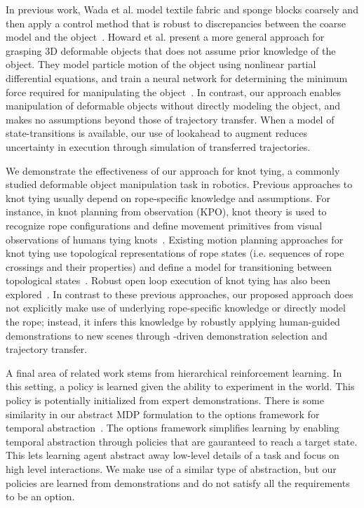 In previous work, Wada et al. model textile fabric and sponge blocks
coarsely and then apply a control method that is robust
to discrepancies between the coarse model and the
object~\cite{Wada_ArticMotion2000}. Howard et al. present a more
general approach for grasping 3D deformable objects
that does not assume prior knowledge of the object.
They model particle motion of the object using nonlinear partial differential
equations, and train a neural network for determining the minimum force
required for manipulating the object~\cite{Howard_AutRobots2000}.
In contrast, our approach enables manipulation of deformable objects
without directly modeling the object, and makes no assumptions beyond
those of trajectory transfer. When a model of state-transitions
is available, our use of
lookahead to augment \mmql{} reduces uncertainty in execution through
simulation of transferred trajectories.

We demonstrate the effectiveness of our approach for
knot tying, a commonly studied deformable object manipulation task in robotics.
Previous approaches to knot tying usually depend on rope-specific knowledge
and assumptions.
For instance, in knot planning from observation (KPO), knot theory is used
to recognize rope configurations and define
movement primitives from visual observations of humans tying
knots~\cite{Morita_ICRA2003, Takamatsu_TransRob2006}.
Existing motion planning approaches for knot tying use topological
representations of rope states (i.e. sequences of rope crossings and their
properties) and define a model for transitioning between topological
states~\cite{Moll_IEEERobot2006, Saha_ExpRobotics2008, Wakamatsu_IJRR2006}.
Robust open loop execution of knot tying has also been explored~\cite{Bell_PhD2010}.
In contrast to these previous approaches, our proposed approach does not
explicitly make use of underlying rope-specific
knowledge or directly model the rope; instead, it infers this knowledge by
robustly applying human-guided demonstrations to new scenes through
\mmql{}-driven demonstration selection and trajectory transfer.

A final area of related work stems from hierarchical reinforcement learning. 
In this setting, a policy is learned given the ability to experiment in the world.
This policy is potentially initialized from expert demonstrations.
There is some similarity in our abstract MDP formulation to the options 
framework for temporal abstraction~\cite{sutton1999between}.
The options framework simplifies learning by enabling temporal abstraction through
policies that are gauranteed to reach a target state. 
This lets learning agent abstract away low-level details of a task and focus on 
high level interactions. 
We make use of a similar type of abstraction, but our policies are learned from 
demonstrations and do not satisfy all the requirements to be an option.

